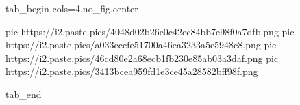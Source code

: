  
 
 
 
 


\ifcmt
  tab_begin cols=4,no_fig,center

     pic https://i2.paste.pics/4048d02b26e0c42ec84bb7e98f0a7dfb.png
		 pic https://i2.paste.pics/a033cccfe51700a46ea3233a5e5948c8.png
		 pic https://i2.paste.pics/46cd80e2a68ecb1fb230e85ab03a3daf.png
		 pic https://i2.paste.pics/3413bcea959fd1e3ce45a28582bff98f.png

  tab_end
\fi
